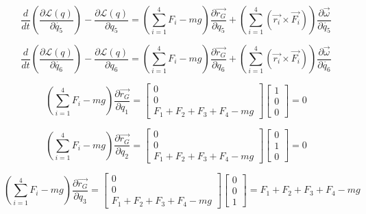 \documentclass{article}
\begin{document}
\begin{equation}
\frac{d}{dt}(\frac{\partial\mathcal{L}(q)}{\partial\dot{q_{5}}})- \frac{\partial\mathcal{L}(q)}{\partial q_{5}}= (\sum_{i=1}^{4}F_{i} - mg)\frac{\partial\overrightarrow{r_{G}}}{\partial q_{5}}+(\sum_{i=1}^{4}(\overrightarrow{r_{i}}\times\overrightarrow{F_{i}}))\frac{\partial\overrightarrow{\omega}}{\partial\dot{q_{5}}}
\end{equation}

\begin{equation}
\frac{d}{dt}(\frac{\partial\mathcal{L}(q)}{\partial\dot{q_{6}}}) - \frac{\partial\mathcal{L}(q)}{\partial q_{6}}= (\sum_{i=1}^{4}F_{i} - mg)\frac{\partial\overrightarrow{r_{G}}}{\partial q_{6}}+(\sum_{i=1}^{4}(\overrightarrow{r_{i}}\times\overrightarrow{F_{i}}))\frac{\partial\overrightarrow{\omega}}{\partial\dot{q_{6}}}
\end{equation}

\begin{equation}
(\sum_{i=1}^{4}F_{i} - mg)\frac{\partial\overrightarrow{r_{G}}}{\partial q_{1}} =\left[\begin{array}{c} 0 \\ 0 \\ F_{1} + F_{2} + F_{3} + F_{4} -mg\end{array}\right]\left[\begin{array}{c} 1 \\ 0 \\ 0\end{array}\right] = 0
\end{equation}

\begin{equation}
(\sum_{i=1}^{4}F_{i} - mg)\frac{\partial\overrightarrow{r_{G}}}{\partial q_{2}} =\left[\begin{array}{c} 0 \\ 0 \\ F_{1} + F_{2} + F_{3} + F_{4} -mg\end{array}\right]\left[\begin{array}{c} 0 \\ 1 \\ 0\end{array}\right] = 0
\end{equation}

\begin{equation}
(\sum_{i=1}^{4}F_{i} - mg)\frac{\partial\overrightarrow{r_{G}}}{\partial q_{3}} =\left[\begin{array}{c} 0 \\ 0 \\ F_{1} + F_{2} + F_{3} + F_{4} -mg\end{array}\right]\left[\begin{array}{c} 0 \\ 0 \\ 1\end{array}\right] = F_{1} + F_{2} + F_{3} + F_{4} -mg
\end{equation}
\end{document}
